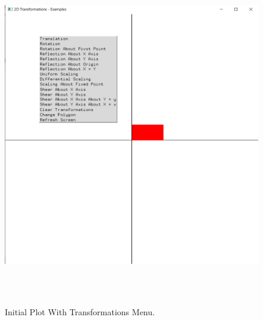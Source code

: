 \documentclass[12pt, a4]{article}
\begin{document}
\newpage
\subsection*{}
\begin{flushleft}

\end{flushleft}


\newpage
\subsection*{}
\begin{figure}[h]
\centering
\caption{Initial Plot With Transformations Menu.}
\includegraphics[height=15cm, width=15cm]{Outputs/Output-1.png}
\end{figure}

\newpage
\end{document}
